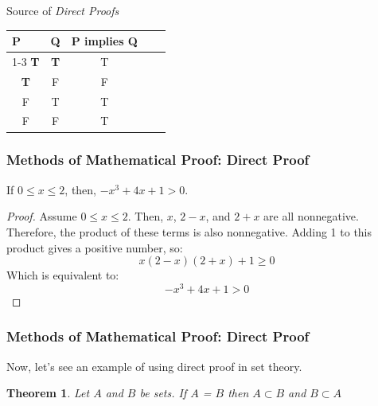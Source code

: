 \documentclass[aspectratio=169]{beamer}
\newtheorem{thm}{Theorem}
\numberwithin{equation}{section}
\begin{document}
\begin{frame}{Source of \emph{Direct Proofs}}

\begin{table}[]
\begin{tabular}{cccll}
\multicolumn{1}{l}{P} & \multicolumn{1}{l}{Q} & \multicolumn{1}{l}{P implies Q} &  &  \\ \cline{1-3}
\textbf{T}                     & \textbf{T}                      &T                             &  &  \\
\textbf{T}                     & F                     & F                               &  &  \\
F                     & T                     & T                             &  &  \\
F                     & F                     & T                             &  & 
\end{tabular}
\end{table} 
\end{frame}


\begin{frame}
\frametitle{Methods of Mathematical Proof: Direct Proof}

\begin{theorem}
If $0 \leq x \leq 2$, then, $- x^{3} + 4x + 1 > 0$.
\end{theorem} \pause

\begin{proof}
Assume $0 \leq x \leq 2$. \pause
Then, $x$, $2 - x$, and $2 + x$ are all nonnegative. \pause
Therefore, the product of these terms is also nonnegative. Adding 1 to this product gives a positive number, so:
$$x (2 - x) (2 + x) + 1 \geq 0$$ \pause
Which is equivalent to:
$$- x^{3} + 4x + 1 > 0$$
\end{proof}

\end{frame}



\begin{frame}
\frametitle{Methods of Mathematical Proof: Direct Proof}

Now, let's see an example of using direct proof in set theory. \pause

\begin{thm} Let $A$ and $B$ be sets.  If $A$ = $B$ then $A \subset B$ and $B \subset A$ 
\end{thm}
\pause
{}

\end{frame}
\end{document}
